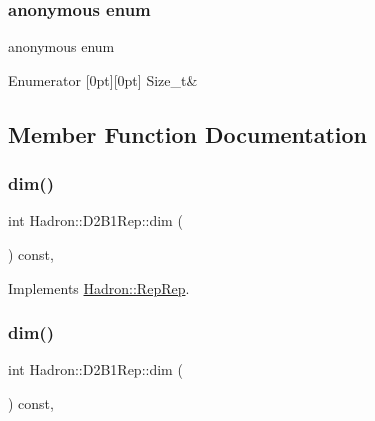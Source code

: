 \subsubsection{\texorpdfstring{anonymous enum}{anonymous enum}}
{\footnotesize\ttfamily anonymous enum}

\begin{DoxyEnumFields}{Enumerator}
[0pt][0pt]{}\mbox{\label{structHadron_1_1D2B1Rep_a2a5699285a966d7ac8d7fdf823d5302ba22229082d3e3653bbe3ecaa33375222a}} 
Size\+\_\+t&\\
\hline

\end{DoxyEnumFields}


\subsection{Member Function Documentation}
\mbox{\label{structHadron_1_1D2B1Rep_a73998a327da6c56b3478b3e356d512d8}} 
\subsubsection{\texorpdfstring{dim()}{dim()}\hspace{0.1cm}{\footnotesize\ttfamily [1/5]}}
{\footnotesize\ttfamily int Hadron\+::\+D2\+B1\+Rep\+::dim (\begin{DoxyParamCaption}{ }\end{DoxyParamCaption}) const\hspace{0.3cm}{\ttfamily [inline]}, {\ttfamily [virtual]}}



Implements \mbox{\hyperlink{structHadron_1_1RepRep_a92c8802e5ed7afd7da43ccfd5b7cd92b}{Hadron\+::\+Rep\+Rep}}.

\mbox{\label{structHadron_1_1D2B1Rep_a73998a327da6c56b3478b3e356d512d8}} 
\subsubsection{\texorpdfstring{dim()}{dim()}\hspace{0.1cm}{\footnotesize\ttfamily [2/5]}}
{\footnotesize\ttfamily int Hadron\+::\+D2\+B1\+Rep\+::dim (\begin{DoxyParamCaption}{ }\end{DoxyParamCaption}) const\hspace{0.3cm}{\ttfamily [inline]}, {\ttfamily [virtual]}}



